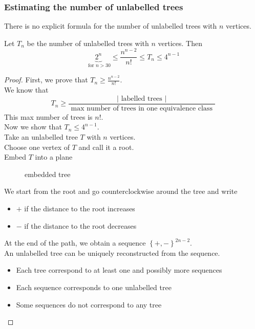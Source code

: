 \documentclass[../main.tex]{subfiles}
\begin{document}
\subsubsection{Estimating the number of unlabelled trees}
There is no explicit formula for the number of unlabelled trees with $n$ vertices.
\begin{thm}
	Let $T_n$ be the number of unlabelled trees with $n$ vertices. Then
\[ 
\underbrace{2^{n} }_{ \text{ for } n>30}\leq  \frac{n^{n-2}}{n!} \leq  T_n \leq  4^{n-1}
\]
	
\end{thm}
\begin{proof}
First, we prove that $T_n \geq \frac{n^{n-2}}{n!}$.\\
We know that
\[ 
	T_n \geq \frac{| \text{ labelled trees } |}{ \text{ max number of trees in one equivalence class } }
\]
This max number of trees is $n!$.\\
Now we show that $T_{n} \leq 4^{n-1}$.\\
Take an unlabelled tree $T$ with $n$ vertices.\\
Choose one vertex of $T$ and call it a root.\\
Embed $T$ into a plane
\begin{figure}[H]
    \centering
    \caption{embedded tree}
    \label{fig:embedded-tree}
\end{figure}
We start from the root and go counterclockwise around the tree and write
\begin{itemize}
\item $+$ if the distance to the root increases
\item $-$ if the distance to the root decreases
\end{itemize}
At the end of the path, we obtain a sequence $ \left\{ +,- \right\} ^{2n-2}$.\\
An unlabelled tree can be uniquely reconstructed from the sequence.\\
\begin{itemize}
\item Each tree correspond to at least one and possibly more sequences
\item Each sequence corresponds to one unlabelled tree
\item Some sequences do not correspond to any tree	
\end{itemize}


\end{proof}
																	
\end{document}
